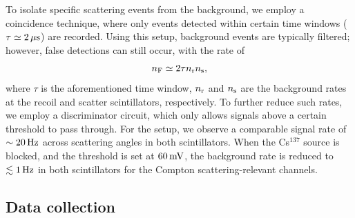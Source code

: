 \documentclass[aps,twocolumn,secnumarabic,balancelastpage,amsmath,amssymb,nofootinbib,floatfix]{revtex4-1}
\newcommand{\mV}{\,{\rm mV}}
\newcommand{\mus}{\,{\rm \mu s}}
\newcommand{\Hz}{\,{\rm Hz}}
\begin{document}
To isolate specific scattering events from the background, we employ a coincidence technique, where only events detected within certain time windows ($\tau \simeq 2\mus$) are recorded. Using this setup, background events are typically filtered; however, false detections can still occur, with the rate of
\begin{equation}
    \label{eqn:false_detection_rate}
    n_{\rm{F}} \simeq 2 \tau n_{\rm{r}} n_{\rm{s}},
\end{equation}
where $\tau$ is the aforementioned time window, $n_{\rm{r}}$ and $n_{\rm{s}}$ are the background rates at the recoil and scatter scintillators, respectively. To further reduce such rates, we employ a discriminator circuit, which only allows signals above a certain threshold to pass through. For the setup, we observe a comparable signal rate of $\sim 20\Hz$ across scattering angles in both scintillators. When the Cs$^{137}$ source is blocked, and the threshold is set at $60\mV$, the background rate is reduced to $\lesssim 1\Hz$ in both scintillators for the Compton scattering-relevant channels.

\subsection{Data collection}
\label{ssec:data_collection}
\end{document}
